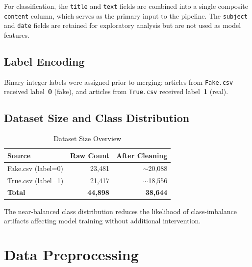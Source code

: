 \documentclass[12pt, a4paper]{article}
\begin{document}
For classification, the \texttt{title} and \texttt{text} fields are combined into a single composite \texttt{content} column, which serves as the primary input to the pipeline. The \texttt{subject} and \texttt{date} fields are retained for exploratory analysis but are not used as model features.

\subsection{Label Encoding}
Binary integer labels were assigned prior to merging: articles from \texttt{Fake.csv} received label~\textbf{0} (fake), and articles from \texttt{True.csv} received label~\textbf{1} (real).

\subsection{Dataset Size and Class Distribution}

\begin{table}[H]
\centering
\caption{Dataset Size Overview}
\begin{tabular}{@{}lrr@{}}
\toprule
\textbf{Source}     & \textbf{Raw Count} & \textbf{After Cleaning} \\
\midrule
Fake.csv (label=0)  & 23,481             & $\sim$20,088            \\
True.csv (label=1)  & 21,417             & $\sim$18,556            \\
\midrule
\textbf{Total}      & \textbf{44,898}    & \textbf{38,644}         \\
\bottomrule
\end{tabular}
\end{table}

The near-balanced class distribution reduces the likelihood of class-imbalance artifacts affecting model training without additional intervention.

\section{Data Preprocessing}
\end{document}
